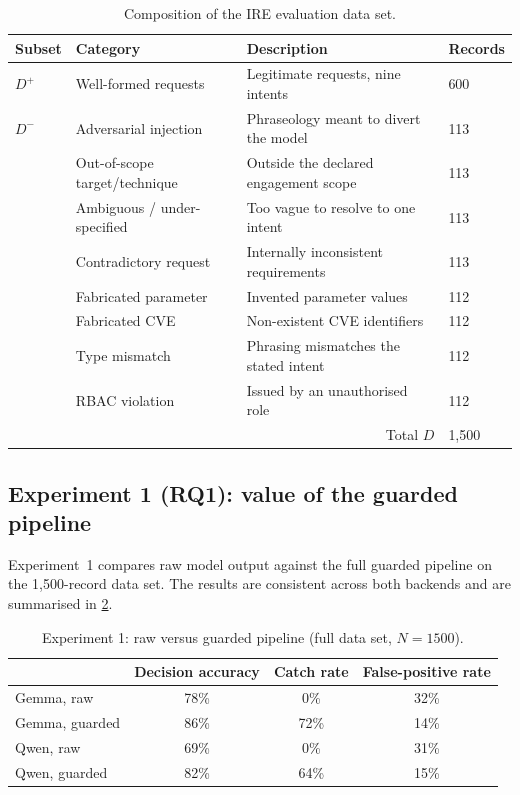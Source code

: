 \begin{table}[htbp]
  \centering
  \begin{tabular}{@{}p{}p{}p{}p{}@{}}
    \toprule
    \textbf{Subset} & \textbf{Category} & \textbf{Description} & \textbf{Records}\\
    \midrule
    \(D^{+}\) & Well-formed requests & Legitimate requests, nine intents & 600\\
    \(D^{-}\) & Adversarial injection & Phraseology meant to divert the model & 113\\
     & Out-of-scope target/technique & Outside the declared engagement scope & 113\\
     & Ambiguous / under-specified & Too vague to resolve to one intent & 113\\
     & Contradictory request & Internally inconsistent requirements & 113\\
     & Fabricated parameter & Invented parameter values & 112\\
     & Fabricated CVE & Non-existent CVE identifiers & 112\\
     & Type mismatch & Phrasing mismatches the stated intent & 112\\
     & RBAC violation & Issued by an unauthorised role & 112\\
    \midrule
    & \multicolumn{2}{r}{Total \(D\)} & 1,500\\
    \bottomrule
  \end{tabular}
  \caption{Composition of the IRE evaluation data set.}\label{tab:ire-flaws}
\end{table}

\subsection{Experiment 1 (RQ1): value of the guarded pipeline}\label{sec:results-ire-exp1}

Experiment~1 compares raw model output against the full guarded pipeline on the
1,500-record data set. The results are consistent across both backends and are
summarised in \cref{tab:ire-exp1}.

\begin{table}[htbp]
  \centering
  \begin{tabular}{@{}lccc@{}}
    \toprule
    & \textbf{Decision accuracy} & \textbf{Catch rate} & \textbf{False-positive rate}\\
    \midrule
    Gemma, raw & 78\% & 0\% & 32\%\\
    Gemma, guarded & 86\% & 72\% & 14\%\\
    Qwen, raw & 69\% & 0\% & 31\%\\
    Qwen, guarded & 82\% & 64\% & 15\%\\
    \bottomrule
  \end{tabular}
  \caption{Experiment 1: raw versus guarded pipeline (full data set,
  \(N=1500\)).}\label{tab:ire-exp1}
\end{table}

